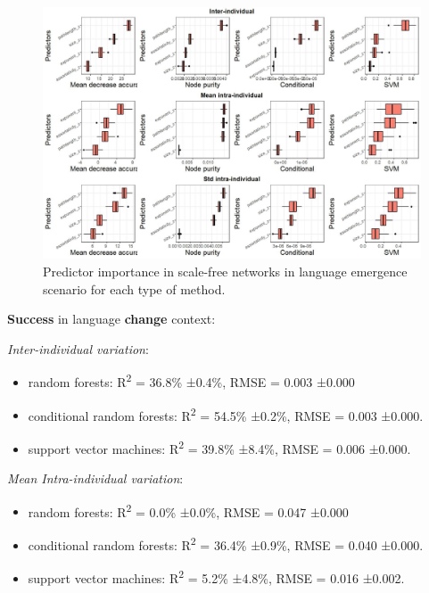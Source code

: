 \documentclass[
]{article}
\providecommand{\tightlist}{%
  \setlength{\itemsep}{0pt}\setlength{\parskip}{0pt}}
\begin{document}
\begin{figure}[!H]

{\centering \includegraphics{./Figures/unnamed-chunk-107-1} 

}

\caption{Predictor importance in scale-free networks in language emergence scenario for each type of method.}\label{fig:unnamed-chunk-107}
\end{figure}

\textbf{Success} in language \textbf{change} context:

\emph{Inter-individual variation}:

\begin{itemize}
\tightlist
\item
  random forests: R\textsuperscript{2} = 36.8\% ±0.4\%, RMSE = 0.003
  ±0.000
\item
  conditional random forests: R\textsuperscript{2} = 54.5\% ±0.2\%, RMSE
  = 0.003 ±0.000.
\item
  support vector machines: R\textsuperscript{2} = 39.8\% ±8.4\%, RMSE =
  0.006 ±0.000.
\end{itemize}

\emph{Mean Intra-individual variation}:

\begin{itemize}
\tightlist
\item
  random forests: R\textsuperscript{2} = 0.0\% ±0.0\%, RMSE = 0.047
  ±0.000
\item
  conditional random forests: R\textsuperscript{2} = 36.4\% ±0.9\%, RMSE
  = 0.040 ±0.000.
\item
  support vector machines: R\textsuperscript{2} = 5.2\% ±4.8\%, RMSE =
  0.016 ±0.002.
\end{itemize}
\end{document}
